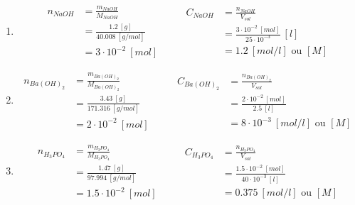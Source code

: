 \documentclass[
  11pt,
  a4paper,
  openany]{book}
\providecommand{\tightlist}{%
  \setlength{\itemsep}{0pt}\setlength{\parskip}{0pt}}
\begin{document}
\begin{Answer}

\begin{enumerate}
\def\labelenumi{\arabic{enumi}.}
\tightlist
\item
  \[
  \begin{split}
    n_{NaOH} &= \frac{m_{NaOH}}{M_{NaOH}} \\
    &= \frac{1.2\ [g]}{40.008\ [g/mol]} \\
    &= 3 \cdot 10^{-2}\ [mol]
  \end{split}
  \qquad
  \begin{split}
    C_{NaOH} &= \frac{n_{NaOH}}{V_{sol}} \\
    &= \frac{3 \cdot 10^{-2}\ [mol]}{25 \cdot 10^{-3}}\ [l] \\
    &= 1.2\ [mol/l] \text{ ou } [M]
  \end{split}
  \]
\item
  \[
  \begin{split}
    n_{Ba(OH)_2} &= \frac{m_{Ba(OH)_2}}{M_{Ba(OH)_2}} \\
    &= \frac{3.43\ [g]}{171.316\ [g/mol]} \\
    &= 2 \cdot 10^{-2}\ [mol]
  \end{split}
  \qquad
  \begin{split}
    C_{Ba(OH)_2} &= \frac{n_{Ba(OH)_2}}{V_{sol}} \\
    &= \frac{2 \cdot 10^{-2}\ [mol]}{2.5\ [l]} \\
    &= 8 \cdot 10^{-3}\ [mol/l] \text{ ou } [M]
  \end{split}
  \]
\item
  \[
  \begin{split}
    n_{H_3PO_4} &= \frac{m_{H_3PO_4}}{M_{H_3PO_4}} \\
    &= \frac{1.47\ [g]}{97.994\ [g/mol]} \\
    &= 1.5 \cdot 10^{-2}\ [mol]
  \end{split}
  \qquad
  \begin{split}
    C_{H_3PO_4} &= \frac{n_{H_3PO_4}}{V_{sol}} \\
    &= \frac{1.5 \cdot 10^{-2}\ [mol]}{40 \cdot 10^{-3}\ [l]} \\
    &= 0.375\ [mol/l] \text{ ou } [M]
  \end{split}
  \]
\end{enumerate}

\end{Answer}

\newpage
\end{document}
